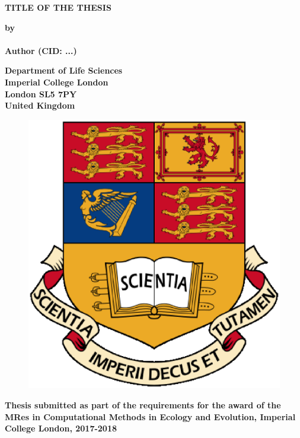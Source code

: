 \thispagestyle{empty}
\null\vskip0.2in%
\begin{center}
\LARGE{{\bf 
TITLE OF THE THESIS}}
\end{center}

\vspace{0.5cm}

\begin{center}
{\Large {\bf by}}\\
\mbox{} \\
{\Large {\bf Author (CID: ...)}}
\end{center}

\vspace{1cm}

\begin{center}
\large{\bf{Department of Life Sciences \\ Imperial College London \\
London SL5 7PY \\ United Kingdom}}
\end{center}


\vspace{1.5cm}

\begin{figure}[!h]
\centering
\includegraphics[scale=0.4]{IC_Crest.eps}
\end{figure}

\vspace{1.5cm}

\begin{center}
\large{\bf{Thesis submitted as part of the requirements for the award of the \\
MRes in Computational Methods in Ecology and Evolution, Imperial College London, 2017-2018}}
\end{center}

\vspace{2cm}

